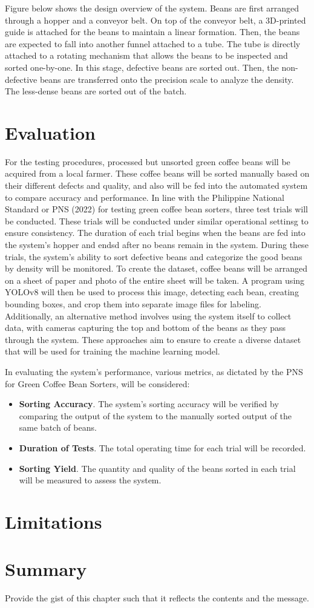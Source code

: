 Figure below shows the design overview of the system. Beans are first arranged through a hopper and a conveyor belt. On top of the conveyor belt, a 3D-printed guide is attached for the beans to maintain a linear formation. Then, the beans are expected to fall into another funnel attached to a tube. The tube is directly attached to a rotating mechanism that allows the beans to be inspected and sorted one-by-one. In this stage, defective beans are sorted out. Then, the non-defective beans are transferred onto the precision scale to analyze the density. The less-dense beans are sorted out of the batch.

\section{Evaluation}
\label{sec:evaluate}

For the testing procedures, processed but unsorted green coffee beans will be acquired from a local farmer. These coffee beans will be sorted manually based on their different defects and quality, and also will be fed into the automated system to compare accuracy and performance. In line with the Philippine National Standard  or PNS (2022) for testing green coffee bean sorters, three test trials will be conducted. These trials will be conducted under similar operational settinsg to ensure consistency. The duration of each trial begins when the beans are fed into the system’s hopper and endsd after no beans remain in the system. During these trials, the system’s ability to sort defective beans and categorize the good beans by density will be monitored.
To create the dataset, coffee beans will be arranged on a sheet of paper and photo of the entire sheet will be taken. A program using YOLOv8 will then be used to process this image, detecting each bean, creating bounding boxes, and crop them into separate image files for labeling. Additionally, an alternative method involves using the system itself to collect data, with cameras capturing the top and bottom of the beans as they pass through the system. These approaches aim to ensure to create a diverse dataset that will be used for training the machine learning model.

In evaluating the system’s performance, various metrics, as dictated by the PNS for Green Coffee Bean Sorters, will be considered: 
\begin{itemize}
	\item \textbf{Sorting Accuracy}. The system’s sorting accuracy will be verified by comparing the output of the system to the manually sorted output of the same batch of beans.
	\item \textbf{Duration of Tests}. The total operating time for each trial will be recorded.
	\item \textbf{Sorting Yield}. The quantity and quality of the beans sorted in each trial will be measured to assess the system.
\end{itemize}
\section{Limitations}
\section{Summary}

Provide the gist of this chapter such that it reflects the contents and the message.
